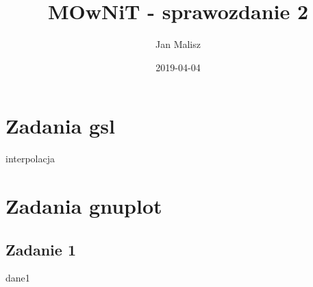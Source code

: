 \documentclass[10pt,a4paper]{article}
\title{MOwNiT - sprawozdanie 2}
\author{Jan Malisz}
\date{2019-04-04}
\begin{document}
  \maketitle
  \thispagestyle{empty}

  \newpage
  \section*{Zadania gsl}\label{sec:ZadaniaGsl}
  {interpolacja}

  \newpage
  \section*{Zadania gnuplot}\label{sec:ZadaniaGnuplot}
  \subsection*{Zadanie 1}\label{sec:Zadanie1}
  {dane1}
\end{document}
